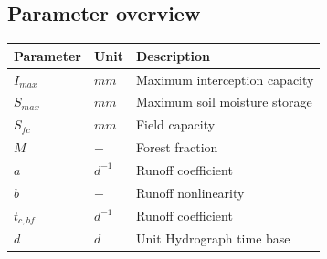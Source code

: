 \subsection{Parameter overview}
\begin{table}[htbp]
  \centering
    \begin{tabular}{lll}
    \toprule
    Parameter & Unit  & Description \\
    \midrule
    $I_{max}$ & $mm$  & Maximum interception capacity \\
    $S_{max}$ & $mm$  & Maximum soil moisture storage \\
    $S_{fc}$ & $mm$  & Field capacity \\
    $M$   & $-$   & Forest fraction \\
    $a$   & $d^{-1}$ & Runoff coefficient \\
    $b$   & $-$   & Runoff nonlinearity \\
    $t_{c,bf}$ & $d^{-1}$ & Runoff coefficient \\
    $d$   & $d$   & Unit Hydrograph time base \\
    \bottomrule
    \end{tabular}%
  \label{tab:addlabel}%
\end{table}%

